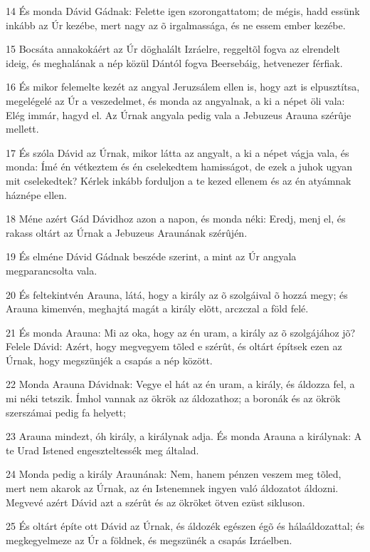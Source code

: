 \par 14 És monda Dávid Gádnak: Felette igen szorongattatom; de mégis, hadd essünk inkább az Úr kezébe, mert nagy az õ irgalmassága, és ne essem ember kezébe.
\par 15 Bocsáta annakokáért az Úr döghalált Izráelre, reggeltõl fogva az elrendelt ideig, és meghalának a nép közül Dántól fogva  Beersebáig, hetvenezer férfiak.
\par 16 És mikor felemelte kezét az angyal Jeruzsálem ellen is, hogy azt is elpusztítsa, megelégelé az Úr a veszedelmet, és monda az angyalnak, a ki a népet öli vala: Elég immár, hagyd el. Az Úrnak angyala pedig vala a Jebuzeus  Arauna szérûje mellett.
\par 17 És szóla Dávid az Úrnak, mikor látta az angyalt, a ki a népet vágja vala, és monda: Ímé én vétkeztem és én cselekedtem hamisságot, de ezek a juhok ugyan mit cselekedtek? Kérlek inkább forduljon a te kezed ellenem és az én atyámnak háznépe ellen.
\par 18 Méne azért Gád Dávidhoz azon a napon, és monda néki: Eredj, menj el, és rakass oltárt az Úrnak a Jebuzeus Araunának szérûjén.
\par 19 És elméne Dávid Gádnak beszéde szerint, a mint az Úr angyala megparancsolta vala.
\par 20 És feltekintvén Arauna, látá, hogy a király az õ szolgáival õ hozzá megy; és Arauna kimenvén, meghajtá  magát a király elõtt, arczczal a föld felé.
\par 21 És monda Arauna: Mi az oka, hogy az én uram, a király az õ szolgájához jõ? Felele Dávid: Azért, hogy megvegyem tõled e szérût, és oltárt építsek ezen az Úrnak, hogy megszünjék a csapás a nép között.
\par 22 Monda Arauna Dávidnak: Vegye el hát az én uram, a király, és áldozza fel, a mi néki tetszik. Ímhol vannak az ökrök az áldozathoz; a boronák és az ökrök szerszámai pedig fa helyett;
\par 23 Arauna mindezt, óh király, a királynak adja. És monda Arauna a királynak: A te Urad Istened engeszteltessék meg általad.
\par 24 Monda pedig a király Araunának: Nem, hanem pénzen veszem meg tõled, mert nem akarok az Úrnak, az én Istenemnek ingyen való áldozatot áldozni. Megvevé azért Dávid azt a szérût és az ökröket ötven ezüst sikluson.
\par 25 És oltárt építe ott Dávid az Úrnak, és áldozék egészen égõ és hálaáldozattal;  és megkegyelmeze az Úr a földnek, és megszünék a csapás Izráelben.


